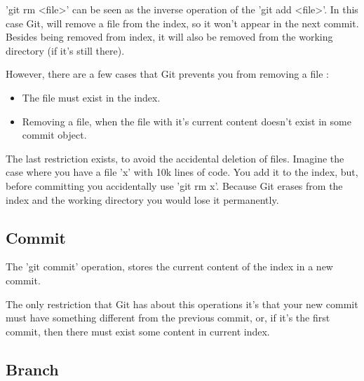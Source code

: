 \pagebreak

'git rm <file>' can be seen as the inverse operation of the 'git add <file>'.
In this case Git, will remove a file from the index, so it won't appear in the
next commit. Besides being removed from index, it will also be removed from the 
working directory (if it's still there). \par
However, there are a few cases that Git prevents you from removing a file : 
\begin{itemize}
\item The file must exist in the index.
\item Removing a file, when the file with it's current content 
doesn't exist in some commit object.
\end{itemize}
The last restriction exists, to avoid the accidental deletion of files. Imagine the
case where you have a file 'x' with 10k lines of code. You add it to the index,
but, before committing you accidentally use 'git rm x'. Because Git erases from
the index and the working directory you would lose it permanently.

%

\subsection{Commit}

The 'git commit' operation, stores the current content of the index in a new
commit. \par
The only restriction that Git has about this operations 
it's that your new commit must have something different from the previous
commit, or, if it's the first commit, then there must exist some content in
current index. \par

\subsection{Branch}

